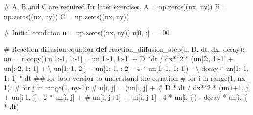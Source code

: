\documentclass[
  letterpaper,
  DIV=11,
  numbers=noendperiod]{scrreprt}
\newenvironment{Shaded}{\begin{snugshade}}{\end{snugshade}}
\newcommand{\CommentTok}[1]{\textcolor[rgb]{0.37,0.37,0.37}{#1}}
\newcommand{\DecValTok}[1]{\textcolor[rgb]{0.68,0.00,0.00}{#1}}
\newcommand{\KeywordTok}[1]{\textcolor[rgb]{0.00,0.23,0.31}{\textbf{#1}}}
\newcommand{\NormalTok}[1]{\textcolor[rgb]{0.00,0.23,0.31}{#1}}
\newcommand{\OperatorTok}[1]{\textcolor[rgb]{0.37,0.37,0.37}{#1}}
\theoremstyle{definition}
\theoremstyle{remark}
\begin{document}
\begin{tcolorbox}
\begin{Shaded}
\begin{Highlighting}[]
\CommentTok{\# A, B and C are required for later exercises.}
\NormalTok{A }\OperatorTok{=}\NormalTok{ np.zeros((nx, ny))}
\NormalTok{B }\OperatorTok{=}\NormalTok{ np.zeros((nx, ny))}
\NormalTok{C }\OperatorTok{=}\NormalTok{ np.zeros((nx, ny))}

\CommentTok{\# Initial condition}
\NormalTok{u }\OperatorTok{=}\NormalTok{ np.zeros((nx, ny))}
\NormalTok{u[}\DecValTok{0}\NormalTok{, :] }\OperatorTok{=} \DecValTok{100}

\CommentTok{\# Reaction{-}diffusion equation}
\KeywordTok{def}\NormalTok{ reaction\_diffusion\_step(u, D, dt, dx, decay):}
\NormalTok{    un }\OperatorTok{=}\NormalTok{ u.copy()}
\NormalTok{    u[}\DecValTok{1}\NormalTok{:}\OperatorTok{{-}}\DecValTok{1}\NormalTok{, }\DecValTok{1}\NormalTok{:}\OperatorTok{{-}}\DecValTok{1}\NormalTok{] }\OperatorTok{=}\NormalTok{ un[}\DecValTok{1}\NormalTok{:}\OperatorTok{{-}}\DecValTok{1}\NormalTok{, }\DecValTok{1}\NormalTok{:}\OperatorTok{{-}}\DecValTok{1}\NormalTok{] }\OperatorTok{+}\NormalTok{  D }\OperatorTok{*}\NormalTok{dt }\OperatorTok{/}\NormalTok{ dx}\OperatorTok{**}\DecValTok{2} \OperatorTok{*}\NormalTok{ (un[}\DecValTok{2}\NormalTok{:, }\DecValTok{1}\NormalTok{:}\OperatorTok{{-}}\DecValTok{1}\NormalTok{] }\OperatorTok{+}\NormalTok{ un[:}\OperatorTok{{-}}\DecValTok{2}\NormalTok{, }\DecValTok{1}\NormalTok{:}\OperatorTok{{-}}\DecValTok{1}\NormalTok{] }\OperatorTok{+} \OperatorTok{\textbackslash{}}
\NormalTok{                    un[}\DecValTok{1}\NormalTok{:}\OperatorTok{{-}}\DecValTok{1}\NormalTok{, }\DecValTok{2}\NormalTok{:]  }\OperatorTok{+}\NormalTok{ un[}\DecValTok{1}\NormalTok{:}\OperatorTok{{-}}\DecValTok{1}\NormalTok{, :}\OperatorTok{{-}}\DecValTok{2}\NormalTok{] }\OperatorTok{{-}} \DecValTok{4} \OperatorTok{*}\NormalTok{ un[}\DecValTok{1}\NormalTok{:}\OperatorTok{{-}}\DecValTok{1}\NormalTok{, }\DecValTok{1}\NormalTok{:}\OperatorTok{{-}}\DecValTok{1}\NormalTok{]) }\OperatorTok{{-}} \OperatorTok{\textbackslash{}}
\NormalTok{                    decay }\OperatorTok{*}\NormalTok{ un[}\DecValTok{1}\NormalTok{:}\OperatorTok{{-}}\DecValTok{1}\NormalTok{, }\DecValTok{1}\NormalTok{:}\OperatorTok{{-}}\DecValTok{1}\NormalTok{] }\OperatorTok{*}\NormalTok{ dt}
    \CommentTok{\#\# for loop version to understand the equation}
    \CommentTok{\# for i in range(1, nx{-}1):}
    \CommentTok{\#     for j in range(1, ny{-}1):}
    \CommentTok{\#         u[i, j] = (un[i, j] +}
    \CommentTok{\#                    D * dt / dx**2 * (un[i+1, j] + un[i{-}1, j] {-} 2 * un[i, j] +}
    \CommentTok{\#                    un[i, j+1] + un[i, j{-}1] {-} 4 * un[i, j]) {-} decay * un[i, j] * dt)}

\end{Highlighting}
\end{Shaded}
\end{tcolorbox}
\end{document}
